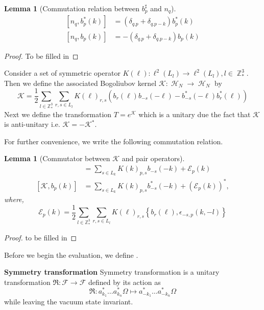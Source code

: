 \documentclass[sn-mathphys,Numbered, a4paper ,nocrop]{sn-jnl}%
\DeclareMathOperator{\Z}{\mathbb{Z}}
\DeclareMathOperator{\HH}{\mathcal{H}}
\newcommand{\com}[1]{\left[ #1 \right]}
\theoremstyle{plain}
\newtheorem{lemma}[theorem]{Lemma}
\theoremstyle{definition}
\theoremstyle{remark}
\theoremstyle{plain}
\theoremstyle{definition}
\theoremstyle{remark}
\begin{document}
\begin{lemma}[Commutation relation between $b^\sharp_p$ and $n_q$]
    \begin{align}
        \com{n_q,b^*_p(k)} &= \left(\delta_{q.p}+\delta_{q.p-k}\right)b^*_p(k)\\
        \com{n_q,b_p(k)} &= -\left(\delta_{q.p}+\delta_{q.p-k}\right)b_p(k)
    \end{align}
\end{lemma} 
\begin{proof}
To be filled in    
\end{proof}

Consider a set of symmetric operator $K(\ell):\ell^2(L_l)\rightarrow \ell^2(L_l), l \in \Z^3_*$. Then we define the associated Bogoliubov kernel $\mathcal{K}:\HH_N\rightarrow\HH_N $ by
\begin{equation}
\mathcal{K} = \frac{1}{2}\sum\limits_{l\in \mathbb{Z}^3_*}\sum\limits_{r,s\in L_l}K(\ell)_{r,s}\left(b_r(\ell)b_{-s}(-\ell)-b^*_{-s}(-\ell)b^*_{r}(\ell)\right)
\end{equation}
Next we define the transformation $T = e^{\mathcal{K}} $ which is a unitary due the fact that $\mathcal{K}$ is anti-unitary i.e. $\mathcal{K}=-\mathcal{K}^* $.

For further convenience, we write the following commutation relation.
\begin{lemma}[Commutator between $\mathcal{K} $ and pair operators]
\begin{align}
    [\mathcal{K}, b^*_p(k)] &=\sum\limits_{s\in L_{k}}K(k)_{p,s}b_{-s}(-k) + \mathcal{E}_{p}(k)\label{eq:13} \\
    [\mathcal{K}, b_p(k)] &=\sum\limits_{s\in L_{k}}K(k)_{p,s}b^*_{-s}(-k) + \left(\mathcal{E}_{p}(k)\right)^*\label{eq:14},
\end{align}
    where, 
\begin{equation}
    \mathcal{E}_{p}(k) = \frac{1}{2}\sum\limits_{l\in \mathbb{Z}^3_*}\sum\limits_{r,s\in L_l}K(\ell)_{r,s}\left\{b_{r}(\ell),\epsilon_{-s,p}(k,-l)\right\} 
\end{equation}
\end{lemma}
\begin{proof}
   to be filled in
\end{proof}
Before we begin the evaluation, we define .

\textbf{Symmetry transformation} Symmetry transformation is a unitary transformation $\mathfrak{R}:\mathcal{F}\rightarrow \mathcal{F}$ defined by its action as
\begin{equation}
    \mathfrak{R}: a^*_{k_1}\ldots a^*_{k_n}\Omega \mapsto a^*_{-k_1}\ldots a^*_{-k_n}\Omega 
\end{equation}
while leaving the vacuum state invariant.
\end{document}
